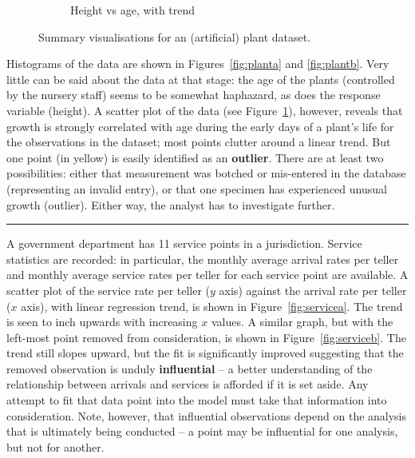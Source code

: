 \begin{figure}[t]
\begin{subfigure}[b]{0.30\textwidth}
                \caption{\small Height vs age, with trend}\label{fig:plantc} 
        \end{subfigure}
        \caption[\small Summary visualisations for a plant dataset]{\small Summary visualisations for an (artificial) plant dataset.}
        \label{fig:plant_data}
\end{figure}
Histograms of the data are shown in Figures~\ref{fig:planta} and \ref{fig:plantb}. Very little can be said about the data at that stage: the age of the plants (controlled by the nursery staff) seems to be somewhat haphazard, as does the response variable (height). A scatter plot of the data (see Figure~\ref{fig:plantc}), however, reveals that growth is strongly correlated with age during the early days of a plant's life for the observations in the dataset; most points clutter around a linear trend. But one point (in yellow) is easily identified as an \textbf{outlier}. There are at least two possibilities: either that measurement was botched or mis-entered in the database (representing an invalid entry), or that one specimen has experienced unusual growth (outlier). Either way, the analyst has to investigate further.  
\begin{center}
    \rule{0.5\textwidth}{.4pt}
\end{center}
A government department has 11 service points in a jurisdiction. Service statistics are recorded: in particular, the monthly average arrival rates per teller and monthly average service rates per teller for each service point are available. A scatter plot of the service rate per teller ($y$ axis) against the arrival rate per teller ($x$ axis), with linear regression trend, is shown in Figure~\ref{fig:servicea}. The trend is seen to inch upwards with increasing $x$ values. A similar graph, but with the left-most point removed from consideration, is shown in Figure~\ref{fig:serviceb}. The trend still slopes upward, but the fit is significantly improved suggesting that the removed observation is unduly \textbf{influential} -- a better understanding of the relationship between arrivals and services is afforded if it is set aside. Any attempt to fit that data point into the model must take that information into consideration. Note, however, that influential observations depend on the analysis that is ultimately being conducted -- a point may be influential for one analysis, but not for another.     
